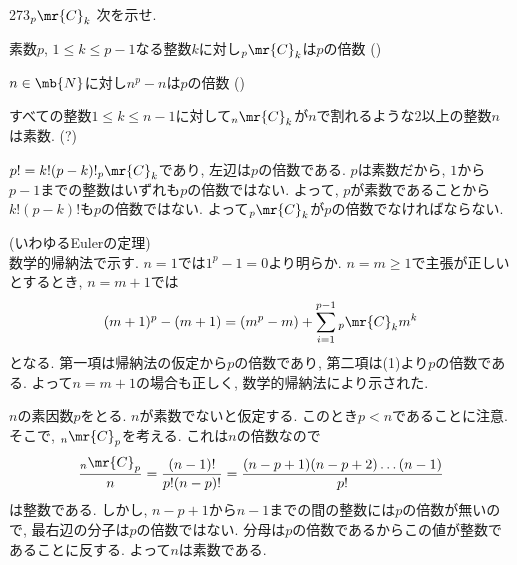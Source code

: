 \begin{prob}{273}{}{${}_{p}\mr{C}_{k}$}
次を示せ. 
\ben 
\item 素数$p$, $1\leq k\leq p-1$なる整数$k$に対し${}_{p}\mr{C}_{k}$は$p$の倍数 () 
\item $n\in\mb{N}$に対し$n^{p} - n$は$p$の倍数 ()
\item すべての整数$1\leq k\leq n-1$に対して${}_{n}\mr{C}_{k}$が$n$で割れるような2以上の整数$n$は素数. (\hosi ?)
\een 

\end{prob} 
$p! = k! (p-k)! {}_{p}\mr{C}_{k}$であり, 左辺は$p$の倍数である. $p$は素数だから, $1$から$p-1$までの整数はいずれも$p$の倍数ではない. よって, $p$が素数であることから$k! (p-k)!$も$p$の倍数ではない. よって${}_{p}\mr{C}_{k}$が$p$の倍数でなければならない. 

 (いわゆるEulerの定理) \\
数学的帰納法で示す. $n=1$では$1^p - 1 = 0$より明らか. $n=m\geq 1$で主張が正しいとするとき, $n=m+1$では
\[
(m+1)^{p} - (m+1) = (m^{p} - m) + \sum_{i=1}^{p-1} {}_{p}\mr{C}_{k} m^{k}
\]
となる. 第一項は帰納法の仮定から$p$の倍数であり, 第二項は(1)より$p$の倍数である. よって$n=m+1$の場合も正しく, 数学的帰納法により示された. 

  $n$の素因数$p$をとる. $n$が素数でないと仮定する. このとき$p<n$であることに注意. そこで, ${}_{n}\mr{C}_{p}$を考える. これは$n$の倍数なので
\[
\dfrac{{}_{n}\mr{C}_{p}}{n} = \dfrac{(n-1)!}{p!(n-p)!} = \dfrac{(n-p+1)(n-p+2) \dots (n-1)}{p!}
\]
は整数である. しかし, $n-p+1$から$n-1$までの間の整数には$p$の倍数が無いので, 最右辺の分子は$p$の倍数ではない. 分母は$p$の倍数であるからこの値が整数であることに反する. よって$n$は素数である. 